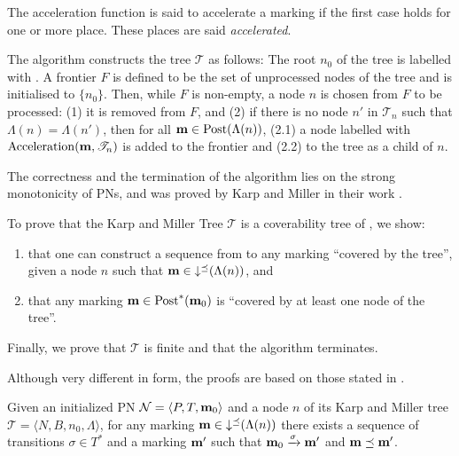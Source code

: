 The acceleration function is said to accelerate a marking if the first case holds for one or more place.
These places are said \emph{accelerated}.


The algorithm constructs the tree $\mathcal{T}$ as follows:
The root $n_0$ of the tree is labelled with \mari.
A frontier $F$ is defined to be the set of unprocessed nodes of the tree and is initialised to $\{n_0\}$.
Then, while $F$ is non-empty, a node $n$ is chosen from $F$ to be processed:
(1) it is removed from $F$, and (2) if there is no node $n'$ in $\mathscr{T}_n$ such that $\Lambda(n) = \Lambda(n')$, then for all \omark $\mathbf{m} \in \operatorname{Post}(\Lambda(n))$, (2.1) a node labelled with $\operatorname{Acceleration}(\mathbf{m}, \mathscr{T}_n)$ is added to the frontier and (2.2) to the tree as a child of $n$.

The correctness and the termination of the algorithm lies on the strong monotonicity of \acp{PN}, and was proved by Karp and Miller in their work \cite{Karp69}.

To prove that the Karp and Miller Tree $\mathcal T$ is a coverability tree of \N, we show:
\begin{enumerate}
  \item \todo{} that one can construct a sequence from \mari to any marking \mar “covered by the tree”, given a node $n$ such that $\mathbf{m} \in \operatorname{\downarrow^\preceq}(\Lambda(n))$, and
  \item \todo{} that any marking $\mathbf{m} \in \operatorname{Post}^*(\mathbf{m}_0)$ is “covered by at least one node of the tree”.
\end{enumerate}

\todo{} Finally, we prove that $\mathcal{T}$ is finite and that the algorithm terminates.

Although very different in form, the proofs are based on those stated in \cite{Karp69}.

\begin{lemm}
  Given an initialized \ac{PN} $\mathcal{N} = \langle P,T, \mathbf{m}_0\rangle$ and a node $n$ of its Karp and Miller tree $\mathcal{T} = \langle N, B, n_0, \Lambda\rangle$,
  for any marking $\mathbf{m} \in \operatorname{\downarrow^\preceq}(\Lambda(n))$ there exists a sequence of transitions $\sigma \in T^*$ and a marking $\mathbf{m'}$ such that $\mathbf{m}_0 \xrightarrow{\sigma} \mathbf{m'}$ and $\mathbf{m} \preceq \mathbf{m'}$.
\end{lemm}


